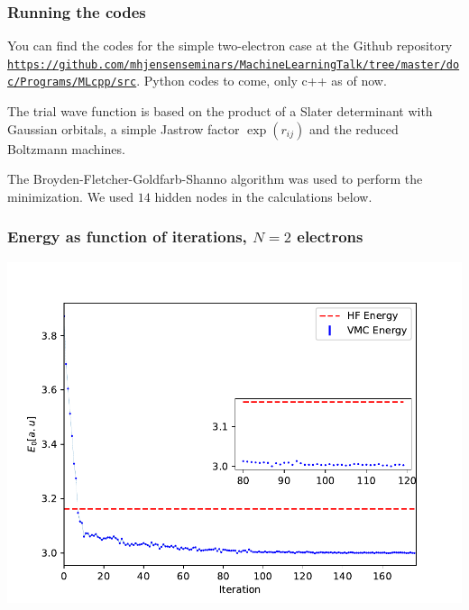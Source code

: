 \documentclass{beamer}
\begin{document}
\begin{frame}
\frametitle{Running the codes}

\begin{block}{}
You can find the codes for the simple two-electron case at the Github repository \href{{https://github.com/mhjensenseminars/MachineLearningTalk/tree/master/doc/Programs/MLcpp/src}}{\nolinkurl{https://github.com/mhjensenseminars/MachineLearningTalk/tree/master/doc/Programs/MLcpp/src}}. Python codes to come, only c++ as of now. 

The trial wave function is based on the product of a Slater determinant with Gaussian orbitals, a simple Jastrow factor $\exp{(r_{ij})}$ and the reduced Boltzmann machines. 

The Broyden-Fletcher-Goldfarb-Shanno algorithm was used to perform the minimization. We used $14$ hidden nodes in the calculations below.

\end{block}
\end{frame}

\begin{frame}
\frametitle{Energy as function of iterations, $N=2$ electrons}

\begin{block}{}


\vspace{6mm}

\centerline{\includegraphics[width=0.9\linewidth]{figures/figN2.pdf}}

\vspace{6mm}


\end{block}
\end{frame}
\end{document}
